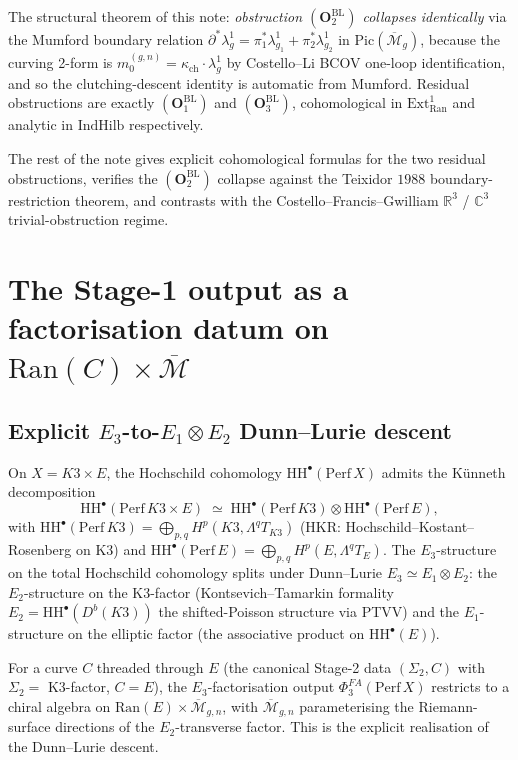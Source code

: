 \documentclass[11pt]{amsart}
\newcommand{\kch}{\kappa_{\mathrm{ch}}}
\newcommand{\Ran}{\mathrm{Ran}}
\newcommand{\IndHilb}{\mathrm{IndHilb}}
\newcommand{\Mbar}{\overline{\mathcal{M}}}
\newcommand{\Perf}{\mathrm{Perf}}
\newcommand{\HH}{\mathrm{HH}}
\newcommand{\bC}{\mathbb{C}}
\newcommand{\bR}{\mathbb{R}}
\begin{document}
The structural theorem of this note: \emph{obstruction
$(\mathbf{O}_2^{\mathrm{BL}})$ collapses identically} via the Mumford
boundary relation
$\partial^*\lambda_g^1 = \pi_1^*\lambda_{g_1}^1 + \pi_2^*\lambda_{g_2}^1$
in $\mathrm{Pic}(\Mbar_g)$, because the curving 2-form is
$m_0^{(g,n)} = \kch \cdot \lambda_g^1$ by Costello--Li BCOV one-loop
identification, and so the clutching-descent identity is automatic
from Mumford. Residual obstructions are exactly
$(\mathbf{O}_1^{\mathrm{BL}})$ and $(\mathbf{O}_3^{\mathrm{BL}})$,
cohomological in $\mathrm{Ext}^1_{\Ran}$ and analytic in
$\IndHilb$ respectively.

The rest of the note gives explicit cohomological formulas for the two
residual obstructions, verifies the $(\mathbf{O}_2^{\mathrm{BL}})$
collapse against the Teixidor $1988$ boundary-restriction theorem,
and contrasts with the Costello--Francis--Gwilliam $\bR^3$ / $\bC^3$
trivial-obstruction regime.

\section{The Stage-1 output as a factorisation datum on
$\Ran(C)\times\Mbar$}
\label{sec:stage-one-output}

\subsection{Explicit $E_3$-to-$E_1\otimes E_2$ Dunn--Lurie descent}

On $X = K3\times E$, the Hochschild cohomology $\HH^\bullet(\Perf\,X)$
admits the Künneth decomposition
\[
\HH^\bullet(\Perf\,K3 \times E) \;\simeq\;
\HH^\bullet(\Perf\,K3) \otimes \HH^\bullet(\Perf\,E),
\]
with $\HH^\bullet(\Perf\,K3) = \bigoplus_{p,q} H^p(K3, \Lambda^q T_{K3})$
(HKR: Hochschild--Kostant--Rosenberg on K3) and
$\HH^\bullet(\Perf\,E) = \bigoplus_{p,q} H^p(E, \Lambda^q T_E)$. The
$E_3$-structure on the total Hochschild cohomology splits under
Dunn--Lurie $E_3 \simeq E_1 \otimes E_2$: the $E_2$-structure on the
K3-factor (Kontsevich--Tamarkin formality $E_2 = \HH^\bullet(D^b(K3))$
the shifted-Poisson structure via PTVV) and the $E_1$-structure on
the elliptic factor (the associative product on $\HH^\bullet(E)$).

For a curve $C$ threaded through $E$ (the canonical Stage-2 data
$(\Sigma_2, C)$ with $\Sigma_2 = $ K3-factor, $C = E$), the
$E_3$-factorisation output $\Phi^{FA}_3(\Perf\,X)$ restricts to a
chiral algebra on $\Ran(E) \times \Mbar_{g,n}$, with $\Mbar_{g,n}$
parameterising the Riemann-surface directions of the $E_2$-transverse
factor. This is the explicit realisation of the Dunn--Lurie descent.
\end{document}
